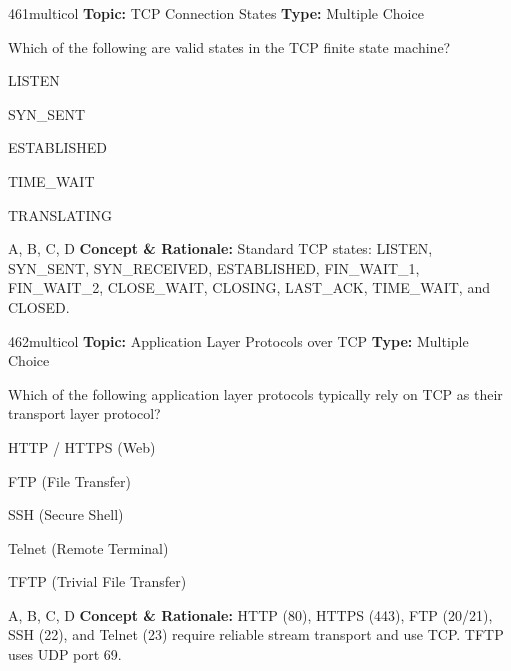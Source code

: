 \begin{qcard}{461}{multicol}
\textcolor{darkslate!75}{\small\textbf{Topic:} TCP Connection States \hfill \textbf{Type:} Multiple Choice}\vspace{0.4em}\par
Which of the following are valid states in the TCP finite state machine?
\begin{qoptions}
\item LISTEN
\item SYN\_SENT
\item ESTABLISHED
\item TIME\_WAIT
\item TRANSLATING
\end{qoptions}
\end{qcard}
\nopagebreak
\begin{explainbox}{A, B, C, D}
\textbf{Concept \& Rationale:} Standard TCP states: LISTEN, SYN\_SENT, SYN\_RECEIVED, ESTABLISHED, FIN\_WAIT\_1, FIN\_WAIT\_2, CLOSE\_WAIT, CLOSING, LAST\_ACK, TIME\_WAIT, and CLOSED.
\end{explainbox}

\begin{qcard}{462}{multicol}
\textcolor{darkslate!75}{\small\textbf{Topic:} Application Layer Protocols over TCP \hfill \textbf{Type:} Multiple Choice}\vspace{0.4em}\par
Which of the following application layer protocols typically rely on TCP as their transport layer protocol?
\begin{qoptions}
\item HTTP / HTTPS (Web)
\item FTP (File Transfer)
\item SSH (Secure Shell)
\item Telnet (Remote Terminal)
\item TFTP (Trivial File Transfer)
\end{qoptions}
\end{qcard}
\nopagebreak
\begin{explainbox}{A, B, C, D}
\textbf{Concept \& Rationale:} HTTP (80), HTTPS (443), FTP (20/21), SSH (22), and Telnet (23) require reliable stream transport and use TCP. TFTP uses UDP port 69.
\end{explainbox}

